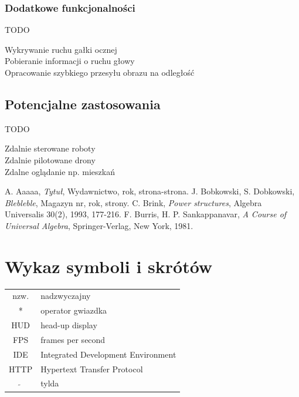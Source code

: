 \documentclass[a4paper,11pt,twoside]{report}
\theoremstyle{definition}
\begin{document}
\subsection{Dodatkowe funkcjonalności}
TODO
\begin{description}
\item [Wykrywanie ruchu gałki ocznej]
\item [Pobieranie informacji o ruchu głowy]
\item [Opracowanie szybkiego przesyłu obrazu na odległość]
\end{description}

\section{Potencjalne zastosowania}
TODO
\begin{description}
\item [Zdalnie sterowane roboty]
\item [Zdalnie pilotowane drony]
\item [Zdalne oglądanie np. mieszkań]
\end{description}


\begin{thebibliography}{20}%

 A. Aaaaa, \emph{Tytuł}, Wydawnictwo, rok, strona-strona.
 J. Bobkowski, S. Dobkowski, \emph{Blebleble}, Magazyn nr, rok, strony.
 C. Brink, \emph{Power structures}, Algebra Universalis 30(2), 1993, 177-216.
 F. Burris, H. P. Sankappanavar, \emph{A Course of Universal Algebra}, Springer-Verlag, New York, 1981.
\end{thebibliography}
\thispagestyle{empty}


\chapter*{Wykaz symboli i skrótów}

\begin{tabular}{cl}
nzw. & nadzwyczajny \\
* & operator gwiazdka \\
HUD & head-up display \\
FPS & frames per second \\
IDE & Integrated Development Environment \\
HTTP & Hypertext Transfer Protocol \\
$\widetilde{}$ & tylda
\end{tabular}
\thispagestyle{empty}
\end{document}
